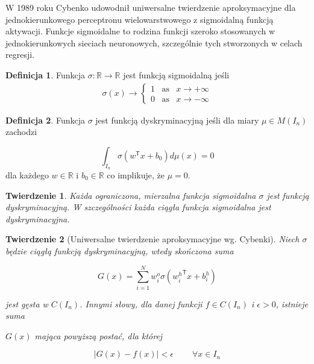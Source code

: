 \documentclass[11pt]{book}
\newtheorem{theorem}{Twierdzenie}[section]
\theoremstyle{definition}
\newtheorem{definition}{Definicja}[section]
\begin{document}
W 1989 roku Cybenko \cite{Cybenko1989} udowodnił uniwersalne twierdzenie aproksymacyjne dla jednokierunkowego perceptronu wielowarstwowego z sigmoidalną funkcją aktywacji. Funkcje sigmoidalne to rodzina funkcji szeroko stosowanych w jednokierunkowych sieciach neuronowych, szczególnie tych stworzonych w celach regresji. 
%
\begin{definition}
	Funkcja $\sigma: \mathbb{R} \rightarrow \mathbb{R}$ jest funkcją sigmoidalną jeśli
	\begin{eqnarray*}
		\sigma(x) \rightarrow \begin{cases} 1 \;\;\;\text{as} &x \rightarrow +\infty\\ 0 \;\;\;\text{as} &x \rightarrow -\infty\end{cases}
	\end{eqnarray*}
	
\end{definition}
%
\begin{definition}
	Funkcja $\sigma$ jest funkcją dyskryminacyjną jeśli dla miary $\mu \in M(I_n)$ zachodzi 
	
	\begin{equation}
	\int_{I_n} \sigma \left( w^\mathsf{T}x + b_0 \right) d\mu(x) = 0
	\end{equation}
	dla każdego $w\in \mathbb{R}$ i $b_0 \in \mathbb{R}$ co implikuje, że $\mu = 0$.
	
\end{definition}
%
\begin{theorem}
	Każda ograniczona, mierzalna funkcja sigmoidalna $\sigma$ jest funkcją dyskryminacyjną. W szczególności każda ciągła funkcja sigmoidalna jest dyskryminacyjna. \cite{Cybenko1989}
\end{theorem}
%
\begin{theorem}[Uniwersalne twierdzenie aproksymacyjne wg. Cybenki]
	
	Niech $\sigma$ będzie ciągłą funkcją dyskryminacyjną, wtedy skończona suma
	
	\begin{equation}
	G\left(x\right) = \sum_{i=1}^{N} w^{o}_i \sigma\left({w^h_i}^{\mathsf{T}}x + b^h_i\right)
	\end{equation}
	
	jest gęsta w $C(I_n)$. Innymi słowy, dla danej funkcji $f \in C(I_n)$ i $\epsilon >0$, istnieje suma
	
	$G(x)$ mająca powyższą postać, dla której
	
	$$
	|G(x) - f(x)| < \epsilon \;\;\;\;\;\;\;\; \forall x \in I_n
	$$
\end{theorem}
\end{document}

